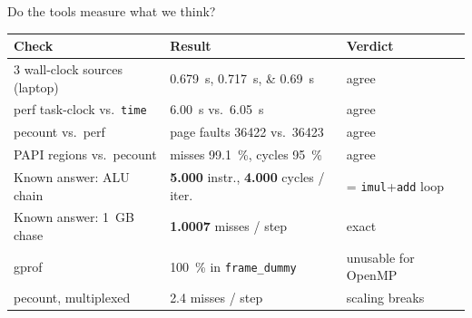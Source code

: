 \documentclass[aspectratio=169,11pt]{beamer}
\begin{document}
\begin{frame}{Do the tools measure what we think?}
  \small
  \begin{tabular}{@{}lll@{}}
    \toprule
    Check & Result & Verdict \\
    \midrule
    3 wall-clock sources (laptop) & \SIlist{0.679;0.717;0.69}{s} & agree \\
    perf task-clock vs.\ \texttt{time} & \SI{6.00}{s} vs.\ \SI{6.05}{s} & agree \\
    pecount vs.\ perf & page faults \num{36422} vs.\ \num{36423} & agree \\
    PAPI regions vs.\ pecount & misses \SI{99.1}{\percent}, cycles \SI{95}{\percent} & agree \\
    Known answer: ALU chain & \textbf{5.000} instr., \textbf{4.000} cycles / iter. & = \texttt{imul}+\texttt{add} loop \\
    Known answer: \SI{1}{GB} chase & \textbf{1.0007} misses / step & exact \\
    gprof & \SI{100}{\percent} in \texttt{frame\_dummy} & \alert{unusable for OpenMP} \\
    pecount, multiplexed & 2.4 misses / step & \alert{scaling breaks} \\
    \bottomrule
  \end{tabular}
\end{frame}
\end{document}
